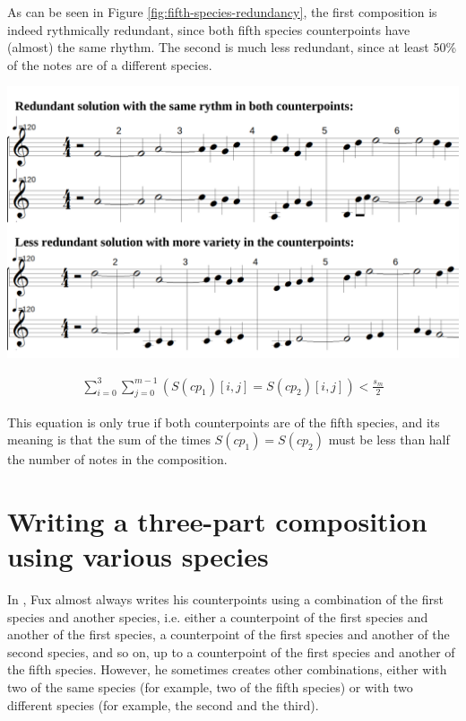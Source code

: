 \begin{minipage}{0.32\textwidth}
As can be seen in Figure \ref{fig:fifth-species-redundancy}, the first composition is indeed rythmically redundant, since both fifth species counterpoints have (almost) the same rhythm. The second is much less redundant, since at least 50\% of the notes are of a different species.
    \end{minipage}
    \hfill
    \begin{minipage}{0.6\textwidth}
      \centering
      \includegraphics[width=\textwidth]{Images/fifth-species-redundancy.png}
      \label{fig:fifth-species-redundancy}
\end{minipage}
\vspace{.5cm}


\begin{equation}
\begin{aligned}
\sum_{i=0}^{3} \sum_{j=0}^{m-1} (S(cp_1)[i,j] = S(cp_2)[i,j]) < \frac{s_m}{2}
\end{aligned}
\end{equation}

This equation is only true if both counterpoints are of the fifth species, and its meaning is that the sum of the times $S(cp_1)=S(cp_2)$ must be less than half the number of notes in the composition.

\section{Writing a three-part composition using various species}
In \gap, Fux almost always writes his counterpoints using a combination of the first species and another species, i.e. either a counterpoint of the first species and another of the first species, a counterpoint of the first species and another of the second species, and so on, up to a counterpoint of the first species and another of the fifth species. However, he sometimes creates other combinations, either with two of the same species (for example, two of the fifth species) or with two different species (for example, the second and the third).

